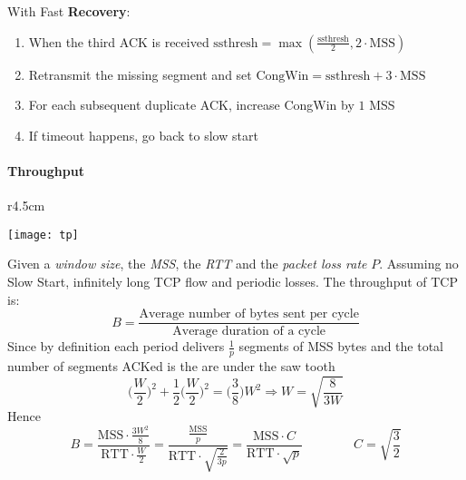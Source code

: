 \begin{itemize}
	With Fast \textbf{Recovery}:
	\begin{enumerate}
		\item When the third ACK is received $\text{ssthresh} = \max(\frac{\text{ssthresh}}{2}, 2 \cdot \text{MSS})$
		\item Retransmit the  missing segment and set $\text{CongWin} = \text{ssthresh} + 3 \cdot \text{MSS}$
		\item For each subsequent duplicate ACK, increase CongWin by $1$ MSS
		\item If timeout happens, go back to slow start
	\end{enumerate}
\end{itemize}

\paragraph{Throughput}
\begin{wrapfigure}[12]{r}{4.5cm}
	\vspace{-1cm}
	\begin{center}
		\texttt{[image: tp]}
	\end{center}
\end{wrapfigure}
Given a \textit{window size}, the \textit{MSS}, the \textit{RTT} and the \textit{packet loss rate} $P$. Assuming no Slow Start, infinitely long TCP flow and periodic losses. The throughput of TCP is:
\begin{equation*}
	B = \frac{\text{Average number of bytes sent per cycle}}{\text{Average duration of a cycle}}
\end{equation*}
Since by definition each period delivers $\frac{1}{p}$ segments of MSS bytes and the total number of segments ACKed is the are under the saw tooth
\begin{equation*}
	\bigg(\frac{W}{2}\bigg)^2 + \frac{1}{2}\bigg(\frac{W}{2}\bigg)^2 = \bigg(\frac{3}{8}\bigg)W^2 \Longrightarrow W=\sqrt{\frac{8}{3W}}
\end{equation*}
Hence
\begin{equation}
	B = \frac{\text{MSS} \cdot \frac{3W^2}{8}}{\text{RTT}\cdot \frac{W}{2}} = \frac{\frac{\text{MSS}}{p}}{\text{RTT} \cdot \sqrt{\frac{2}{3p}}} = \frac{\text{MSS} \cdot C}{\text{RTT} \cdot \sqrt{p}} \qquad\qquad C = \sqrt{\frac{3}{2}}
\end{equation}

